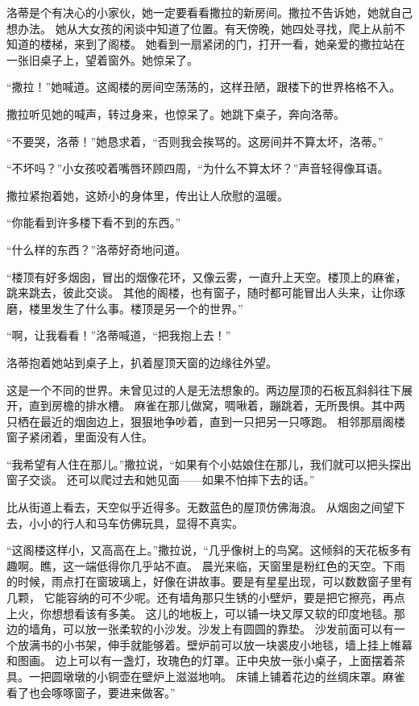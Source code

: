 \documentclass[12pt,UTF8]{ctexbook}
\begin{document}
洛蒂是个有决心的小家伙，她一定要看看撒拉的新房间。撒拉不告诉她，她就自己想办法。
她从大女孩的闲谈中知道了位置。有天傍晚，她四处寻找，爬上从前不知道的楼梯，来到了阁楼。
她看到一扇紧闭的门，打开一看，她亲爱的撒拉站在一张旧桌子上，望着窗外。她惊呆了。

“撒拉！”她喊道。这阁楼的房间空荡荡的，这样丑陋，跟楼下的世界格格不入。

撒拉听见她的喊声，转过身来，也惊呆了。她跳下桌子，奔向洛蒂。

“不要哭，洛蒂！”她恳求着，“否则我会挨骂的。这房间并不算太坏，洛蒂。”

“不坏吗？”小女孩咬着嘴唇环顾四周，“为什么不算太坏？”声音轻得像耳语。

撒拉紧抱着她，这娇小的身体里，传出让人欣慰的温暖。

“你能看到许多楼下看不到的东西。”

“什么样的东西？”洛蒂好奇地问道。

“楼顶有好多烟囱，冒出的烟像花环，又像云雾，一直升上天空。楼顶上的麻雀，跳来跳去，彼此交谈。
其他的阁楼，也有窗子，随时都可能冒出人头来，让你琢磨，楼里发生了什么事。楼顶是另一个的世界。”

“啊，让我看看！”洛蒂喊道，“把我抱上去！”

洛蒂抱着她站到桌子上，扒着屋顶天窗的边缘往外望。

这是一个不同的世界。未曾见过的人是无法想象的。两边屋顶的石板瓦斜斜往下展开，直到房檐的排水槽。
麻雀在那儿做窝，啁啾着，蹦跳着，无所畏惧。其中两只栖在最近的烟囱边上，狠狠地争吵着，直到一只把另一只啄跑。
相邻那扇阁楼窗子紧闭着，里面没有人住。

“我希望有人住在那儿。”撒拉说，“如果有个小姑娘住在那儿，我们就可以把头探出窗子交谈。
还可以爬过去和她见面——如果不怕摔下去的话。”

比从街道上看去，天空似乎近得多。无数蓝色的屋顶仿佛海浪。
从烟囱之间望下去，小小的行人和马车仿佛玩具，显得不真实。

“这阁楼这样小，又高高在上。”撒拉说，“几乎像树上的鸟窝。这倾斜的天花板多有趣啊。瞧，这一端低得你几乎站不直。
晨光来临，天窗里是粉红色的天空。下雨的时候，雨点打在窗玻璃上，好像在讲故事。要是有星星出现，可以数数窗子里有几颗，
它能容纳的可不少呢。还有墙角那只生锈的小壁炉，要是把它擦亮，再点上火，你想想看该有多美。
这儿的地板上，可以铺一块又厚又软的印度地毯。那边的墙角，可以放一张柔软的小沙发。沙发上有圆圆的靠垫。
沙发前面可以有一个放满书的小书架，伸手就能够着。壁炉前可以放一块裘皮小地毯，墙上挂上帷幕和图画。
边上可以有一盏灯，玫瑰色的灯罩。正中央放一张小桌子，上面摆着茶具。一把圆墩墩的小铜壶在壁炉上滋滋地响。
床铺上铺着花边的丝绸床罩。麻雀看了也会啄啄窗子，要进来做客。”
\end{document}
